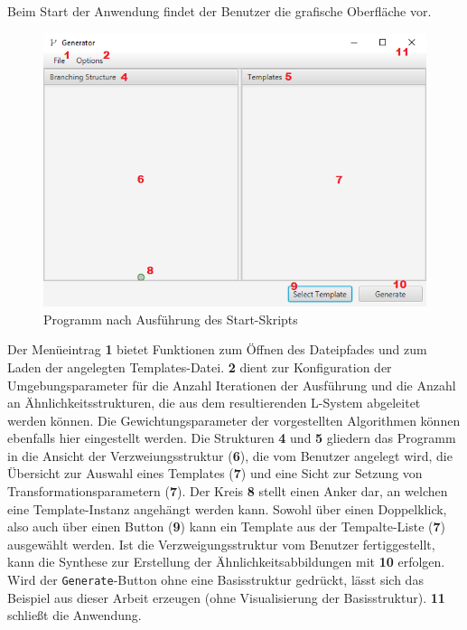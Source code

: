 Beim Start der Anwendung findet der Benutzer die grafische Oberfläche vor.
\begin{figure}[H]
    \centering
    \includegraphics[width=14cm]{../images/UI_numbers1.png}
    \caption{Programm nach Ausführung des Start-Skripts}
\end{figure}
Der Menüeintrag \textbf{1} bietet Funktionen zum Öffnen des Dateipfades und zum Laden der angelegten Templates-Datei.
\textbf{2} dient zur Konfiguration der Umgebungsparameter für die Anzahl Iterationen der Ausführung
und die Anzahl an Ähnlichkeitsstrukturen, die aus dem resultierenden L-System abgeleitet werden können.
Die Gewichtungsparameter der vorgestellten Algorithmen können ebenfalls hier eingestellt werden.
Die Strukturen \textbf{4} und \textbf{5} gliedern das Programm in die Ansicht der Verzweiungsstruktur (\textbf{6}), die vom Benutzer
angelegt wird, die Übersicht zur Auswahl eines Templates (\textbf{7}) und eine Sicht zur Setzung von Transformationsparametern (\textbf{7}).
Der Kreis \textbf{8} stellt einen Anker dar, an welchen eine Template-Instanz angehängt werden kann.
Sowohl über einen Doppelklick, also auch über einen Button (\textbf{9}) kann ein Template aus der Tempalte-Liste (\textbf{7})
ausgewählt werden.
Ist die Verzweigungsstruktur vom Benutzer fertiggestellt, kann die Synthese zur Erstellung der Ähnlichkeitsabbildungen
mit \textbf{10} erfolgen.
Wird der \texttt{Generate}-Button ohne eine Basisstruktur gedrückt, lässt sich das Beispiel aus
dieser Arbeit erzeugen (ohne Visualisierung der Basisstruktur).
\textbf{11} schließt die Anwendung.

